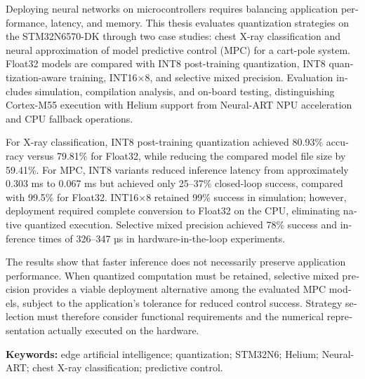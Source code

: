 \begin{otherlanguage}{english}
Deploying neural networks on microcontrollers requires balancing application performance, latency, and memory. This thesis evaluates quantization strategies on the STM32N6570-DK through two case studies: chest X-ray classification and neural approximation of model predictive control (MPC) for a cart-pole system. Float32 models are compared with INT8 post-training quantization, INT8 quantization-aware training, INT16×8, and selective mixed precision. Evaluation includes simulation, compilation analysis, and on-board testing, distinguishing Cortex-M55 execution with Helium support from Neural-ART NPU acceleration and CPU fallback operations.

For X-ray classification, INT8 post-training quantization achieved 80.93\% accuracy versus 79.81\% for Float32, while reducing the compared model file size by 59.41\%. For MPC, INT8 variants reduced inference latency from approximately 0.303 ms to 0.067 ms but achieved only 25–37\% closed-loop success, compared with 99.5\% for Float32. INT16×8 retained 99\% success in simulation; however, deployment required complete conversion to Float32 on the CPU, eliminating native quantized execution. Selective mixed precision achieved 78\% success and inference times of 326–347 µs in hardware-in-the-loop experiments.

The results show that faster inference does not necessarily preserve application performance. When quantized computation must be retained, selective mixed precision provides a viable deployment alternative among the evaluated MPC models, subject to the application's tolerance for reduced control success. Strategy selection must therefore consider functional requirements and the numerical representation actually executed on the hardware.


\textbf{Keywords:} edge artificial intelligence; quantization; STM32N6; Helium; Neural-ART; chest X-ray classification; predictive control.
\end{otherlanguage}
